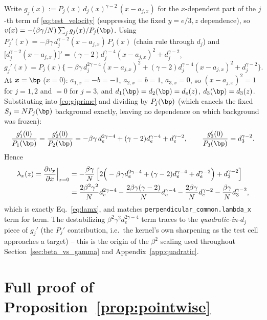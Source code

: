 \documentclass[11pt,a4paper]{article}
\theoremstyle{plain}
\theoremstyle{definition}
\theoremstyle{remark}
\newcommand{\bx}{\bm{x}}
\newcommand{\lam}{\lambda}
\newcommand{\bw}{\beta}
\newcommand{\de}{d_e}
\newcommand{\dth}{d_3}
\begin{document}
Write $g_j(x):=P_j(x)\,d_j(x)^{\gamma-2}\,(x-a_{j,x})$ for the $x$-dependent
part of the $j$-th term of \eqref{eq:test_velocity} (suppressing the fixed
$y=e/3,z$ dependence), so $v(x)=-(\bw\gamma/N)\sum_j g_j(x)/P_j(\bp)$. Using
$P_j'(x)=-\bw\gamma\,d_j^{\gamma-2}(x-a_{j,x})\,P_j(x)$ (chain rule through
$d_j$) and
$\big[d_j^{\gamma-2}(x-a_{j,x})\big]'=(\gamma-2)d_j^{\gamma-4}(x-a_{j,x})^2+d_j^{\gamma-2}$,
\begin{equation}
g_j'(x)=P_j(x)\Big\{-\bw\gamma\,d_j^{2\gamma-4}(x-a_{j,x})^2
+(\gamma-2)d_j^{\gamma-4}(x-a_{j,x})^2+d_j^{\gamma-2}\Big\}.
\label{eq:gjprime}
\end{equation}
At $\bx=\bp$ ($x=0$): $a_{1,x}=-b=-1$, $a_{2,x}=b=1$, $a_{3,x}=0$, so
$(x-a_{j,x})^2=1$ for $j=1,2$ and $=0$ for $j=3$, and $d_1(\bp)=d_2(\bp)=\de(z)$,
$d_3(\bp)=\dth(z)$. Substituting into \eqref{eq:gjprime} and dividing by
$P_j(\bp)$ (which cancels the fixed $S_j=N P_j(\bp)$ background exactly,
leaving no dependence on which background was frozen):
\[
\frac{g_1'(0)}{P_1(\bp)}=\frac{g_2'(0)}{P_2(\bp)}
=-\bw\gamma\,\de^{2\gamma-4}+(\gamma-2)\de^{\gamma-4}+\de^{\gamma-2},
\qquad
\frac{g_3'(0)}{P_3(\bp)}=\dth^{\gamma-2}.
\]
Hence
\begin{align}
\lam_x(z)=\frac{\partial v_x}{\partial x}\Big|_{x=0}
&=-\frac{\bw\gamma}{N}\left[2\Big(-\bw\gamma\de^{2\gamma-4}+(\gamma-2)\de^{\gamma-4}+\de^{\gamma-2}\Big)+\dth^{\gamma-2}\right]\notag\\
&=\frac{2\bw^2\gamma^2}{N}\de^{2\gamma-4}
-\frac{2\bw\gamma(\gamma-2)}{N}\de^{\gamma-4}
-\frac{2\bw\gamma}{N}\de^{\gamma-2}
-\frac{\bw\gamma}{N}\dth^{\gamma-2},
\label{eq:lamx_derived}
\end{align}
which is exactly Eq.~\eqref{eq:lamx}, and matches
\texttt{perpendicular\_common.lambda\_x} term for term. The destabilizing
$\bw^2\gamma^2\de^{2\gamma-4}$ term traces to the \emph{quadratic-in-$d_j$}
piece of $g_j'$ (the $P_j'$ contribution, i.e.\ the kernel's own sharpening
as the test cell approaches a target) -- this is the origin of the $\bw^2$
scaling used throughout Section~\ref{sec:beta_vs_gamma} and
Appendix~\ref{app:quadratic}.

\section{Full proof of Proposition~\ref{prop:pointwise}}
\label{app:pointwise_proof}
\end{document}
